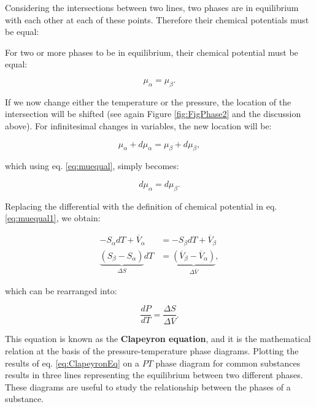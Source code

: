 \documentclass[
  9pt,
]{extbook}
\theoremstyle{definition}
\theoremstyle{definition}
\theoremstyle{definition}
\theoremstyle{remark}
\begin{document}
Considering the intersections between two lines, two phases are in equilibrium with each other at each of these points. Therefore their chemical potentials must be equal:

For two or more phases to be in equilibrium, their chemical potential must be equal:

\begin{equation}
\mu_{\alpha} = \mu_{\beta}.
\label{eq:muequal}
\end{equation}

If we now change either the temperature or the pressure, the location of the intersection will be shifted (see again Figure \ref{fig:FigPhase2} and the discussion above). For infinitesimal changes in variables, the new location will be:

\begin{equation}
\mu_{\alpha} + d\mu_{\alpha}= \mu_{\beta}+d\mu_{\beta},
\label{eq:muequalA}
\end{equation}

which using eq. \eqref{eq:muequal}, simply becomes:

\begin{equation}
d\mu_{\alpha}= d\mu_{\beta}.
\label{eq:muequalB}
\end{equation}

Replacing the differential with the definition of chemical potential in eq. \eqref{eq:muequal1}, we obtain:

\begin{equation}
\begin{aligned}
-S_{\alpha}dT+\overline{V}_{\alpha} &= -S_{\beta}dT+\overline{V}_{\beta} \\
\underbrace{\left(S_{\beta}-S_{\alpha}\right)}_{\Delta S} dT &= \underbrace{\left( \overline{V}_{\beta}-\overline{V}_{\alpha}\right)}_{\Delta \overline{V}},
\end{aligned}
\label{eq:muequalC}
\end{equation}

which can be rearranged into:

\begin{equation}
\frac{dP}{dT}=\frac{\Delta S}{\Delta \overline{V}}.
\label{eq:ClapeyronEq}
\end{equation}

This equation is known as the \textbf{Clapeyron equation}, and it is the mathematical relation at the basis of the pressure-temperature phase diagrams. Plotting the results of eq. \eqref{eq:ClapeyronEq} on a \(PT\) phase diagram for common substances results in three lines representing the equilibrium between two different phases. These diagrams are useful to study the relationship between the phases of a substance.
\end{document}
